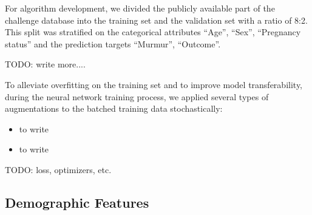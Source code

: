 For algorithm development, we divided the publicly available part of the challenge database into the training set and the validation set with a ratio of 8:2. This split was stratified on the categorical attributes ``Age'', ``Sex'', ``Pregnancy status'' and the prediction targets ``Murmur'', ``Outcome''.

TODO: write more....

To alleviate overfitting on the training set and to improve model transferability, during the neural network training process, we applied several types of augmentations to the batched training data stochastically:
\begin{itemize}
    \item to write
    \item to write
\end{itemize}

TODO: loss, optimizers, etc.



\subsection{Demographic Features}
\label{subsec:demo_feat}


